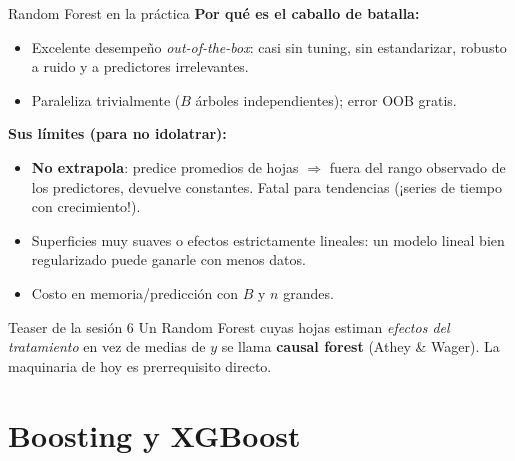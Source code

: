 \documentclass{beamer}
\newcommand{\1}{\mathbb{I}}
\begin{document}
\begin{frame}{Random Forest en la práctica}
\small
\textbf{Por qué es el caballo de batalla:}
\begin{itemize}\itemsep4pt
  \item Excelente desempeño \emph{out-of-the-box}: casi sin tuning, sin estandarizar, robusto a ruido y a predictores irrelevantes.
  \item Paraleliza trivialmente ($B$ árboles independientes); error OOB gratis.
\end{itemize}
\pause

\textbf{Sus límites (para no idolatrar):}
\begin{itemize}\itemsep4pt
  \item \textbf{No extrapola}: predice promedios de hojas $\Rightarrow$ fuera del rango observado de los predictores, devuelve constantes. Fatal para tendencias (¡series de tiempo con crecimiento!). \pause
  \item Superficies muy suaves o efectos estrictamente lineales: un modelo lineal bien regularizado puede ganarle con menos datos.
  \item Costo en memoria/predicción con $B$ y $n$ grandes.
\end{itemize}
\pause

\vspace{0.1cm}
\begin{block}{Teaser de la sesión 6}
Un Random Forest cuyas hojas estiman \emph{efectos del tratamiento} en vez de medias de $y$ se llama \textbf{causal forest} (Athey \& Wager). La maquinaria de hoy es prerrequisito directo.
\end{block}
\end{frame}


\section{Boosting y XGBoost}
\begin{frame}[noframenumbering]
\tableofcontents[currentsection]
\end{frame}
\end{document}
